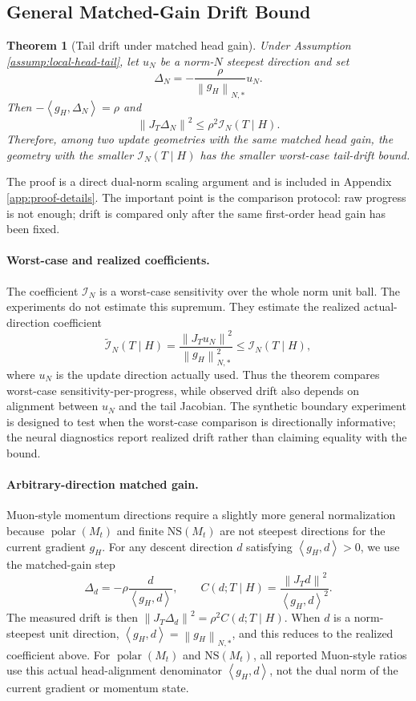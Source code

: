 \documentclass{article}
\newtheorem{theorem}{Theorem}[section]
\theoremstyle{definition}
\newcommand{\I}{\mathcal I}
\newcommand{\norm}[1]{\left\lVert #1 \right\rVert}
\newcommand{\inner}[2]{\left\langle #1,#2 \right\rangle}
\newcommand{\polar}{\operatorname{polar}}
\begin{document}
\subsection{General Matched-Gain Drift Bound}

\begin{theorem}[Tail drift under matched head gain]
Under Assumption \ref{assump:local-head-tail}, let \(u_N\) be a norm-\(N\) steepest direction and set
\[
\Delta_N=-\frac{\rho}{\norm{g_H}_{N,*}}u_N .
\]
Then \(-\inner{g_H}{\Delta_N}=\rho\) and
\[
\norm{J_T\Delta_N}^2\le \rho^2\I_N(T\mid H).
\]
Therefore, among two update geometries with the same matched head gain, the geometry with the smaller \(\I_N(T\mid H)\) has the smaller worst-case tail-drift bound.
\end{theorem}

The proof is a direct dual-norm scaling argument and is included in Appendix \ref{app:proof-details}. The important point is the comparison protocol: raw progress is not enough; drift is compared only after the same first-order head gain has been fixed.

\paragraph{Worst-case and realized coefficients.}
The coefficient \(\I_N\) is a worst-case sensitivity over the whole norm unit ball. The experiments do not estimate this supremum. They estimate the realized actual-direction coefficient
\[
\widetilde{\I}_N(T\mid H)
=
\frac{\norm{J_Tu_N}^2}{\norm{g_H}_{N,*}^2}
\le
\I_N(T\mid H),
\]
where \(u_N\) is the update direction actually used. Thus the theorem compares worst-case sensitivity-per-progress, while observed drift also depends on alignment between \(u_N\) and the tail Jacobian. The synthetic boundary experiment is designed to test when the worst-case comparison is directionally informative; the neural diagnostics report realized drift rather than claiming equality with the bound.

\paragraph{Arbitrary-direction matched gain.}
Muon-style momentum directions require a slightly more general normalization because \(\polar(M_t)\) and finite \(\mathrm{NS}(M_t)\) are not steepest directions for the current gradient \(g_H\). For any descent direction \(d\) satisfying \(\inner{g_H}{d}>0\), we use the matched-gain step
\[
\Delta_d=-\rho\frac{d}{\inner{g_H}{d}},
\qquad
C(d;T\mid H)=\frac{\norm{J_Td}^2}{\inner{g_H}{d}^2}.
\]
The measured drift is then \(\norm{J_T\Delta_d}^2=\rho^2C(d;T\mid H)\). When \(d\) is a norm-steepest unit direction, \(\inner{g_H}{d}=\norm{g_H}_{N,*}\), and this reduces to the realized coefficient above. For \(\polar(M_t)\) and \(\mathrm{NS}(M_t)\), all reported Muon-style ratios use this actual head-alignment denominator \(\inner{g_H}{d}\), not the dual norm of the current gradient or momentum state.
\end{document}
